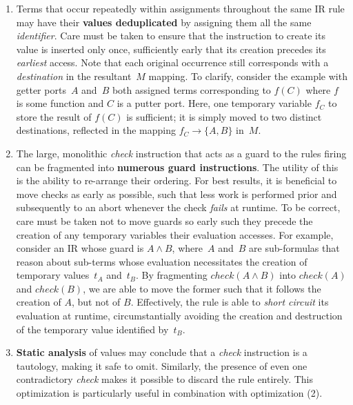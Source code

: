 \begin{enumerate}
	\item Terms that occur repeatedly within assignments throughout the same IR rule may have their \textbf{values deduplicated} by assigning them all the same \textit{identifier}. Care must be taken to ensure that the instruction to create its value is inserted only once, sufficiently early that its creation precedes its \textit{earliest} access. Note that each original occurrence still corresponds with a \textit{destination} in the resultant~$M$ mapping. To clarify, consider the example with getter ports~$A$ and~$B$ both assigned terms corresponding to $f(C)$ where $f$ is some function and $C$ is a putter port. Here, one temporary variable $f_C$ to store the result of $f(C)$ is sufficient; it is simply moved to two distinct destinations, reflected in the mapping $f_C\rightarrow\{A,B\}$ in~$M$.
	
	\item The large, monolithic \textit{check} instruction that acts as a guard to the rules firing can be fragmented into \textbf{numerous guard instructions}. The utility of this is the ability to re-arrange their ordering. For best results, it is beneficial to move checks as early as possible, such that less work is performed prior and subsequently to an abort whenever the check \textit{fails} at runtime. To be correct, care must be taken not to move guards so early such they precede the creation of any temporary variables their evaluation accesses. For example, consider an IR 
	whose guard is $A\wedge{}B$, where~$A$ and~$B$ are sub-formulas that reason about sub-terms whose evaluation necessitates the creation of temporary values~$t_A$ and~$t_B$. By fragmenting $check(A\wedge{}B)$ into $check(A)$ and $check(B)$, we are able to move the former such that it follows the creation of $A$, but not of $B$. Effectively, the rule is able to \textit{short circuit} its evaluation at runtime, circumstantially avoiding the creation and destruction of the temporary value identified by~$t_B$.
	
	\item \textbf{Static analysis} of values may conclude that a \textit{check} instruction is a tautology, making it safe to omit. Similarly, the presence of even one contradictory \textit{check} makes it possible to discard the rule entirely. This optimization is particularly useful in combination with optimization (2).
\end{enumerate}

